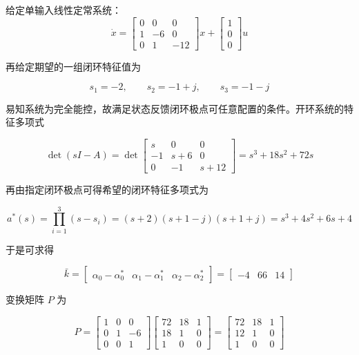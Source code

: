 \begin{example}
    给定单输入线性定常系统：
        \[
    \dot{x}=
    \begin{bmatrix}
    0 & 0 & 0\\
    1 & -6 & 0\\
    0 & 1 & -12
    \end{bmatrix}x+
    \begin{bmatrix}
    1\\
    0\\
    0
    \end{bmatrix}u
    \]

    再给定期望的一组闭环特征值为

    \[
    s_1=-2,\qquad s_2=-1+j,\qquad s_3=-1-j
    \]

    易知系统为完全能控，故满足状态反馈闭环极点可任意配置的条件。开环系统的特征多项式

    \[
    \det(sI-A)=
    \det
    \begin{bmatrix}
    s & 0 & 0\\
    -1 & s+6 & 0\\
    0 & -1 & s+12
    \end{bmatrix}
    =s^3+18s^2+72s
    \]

    再由指定闭环极点可得希望的闭环特征多项式为

    \[
    a^*(s)=\prod_{i=1}^{3}(s-s_i)
    =(s+2)(s+1-j)(s+1+j)
    =s^3+4s^2+6s+4
    \]

    于是可求得

    \[
    \bar{k}=
    \begin{bmatrix}
    \alpha_0-\alpha_0^* & \alpha_1-\alpha_1^* & \alpha_2-\alpha_2^*
    \end{bmatrix}
    =
    \begin{bmatrix}
    -4 & 66 & 14
    \end{bmatrix}
    \]

    变换矩阵 $P$ 为

    \[
    P=
    \begin{bmatrix}
    1 & 0 & 0\\
    0 & 1 & -6\\
    0 & 0 & 1
    \end{bmatrix}
    \begin{bmatrix}
    72 & 18 & 1\\
    18 & 1 & 0\\
    1 & 0 & 0
    \end{bmatrix}
    =
    \begin{bmatrix}
    72 & 18 & 1\\
    12 & 1 & 0\\
    1 & 0 & 0
    \end{bmatrix}
    \]


\end{example}
